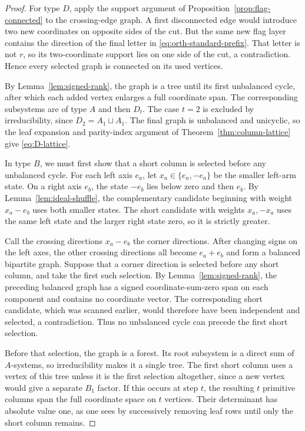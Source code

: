 \documentclass[11pt]{amsart}
\numberwithin{equation}{section}
\theoremstyle{definition}
\begin{document}
\begin{proof}
For type $D$, apply the support argument of Proposition~\ref{prop:flag-connected} to the crossing-edge graph. A first disconnected edge would introduce two new coordinates on opposite sides of the cut. But the same new flag layer contains the direction of the final letter in \eqref{eq:orth-standard-prefix}. That letter is not $r$, so its two-coordinate support lies on one side of the cut, a contradiction. Hence every selected graph is connected on its used vertices.

By Lemma~\ref{lem:signed-rank}, the graph is a tree until its first unbalanced cycle, after which each added vertex enlarges a full coordinate span. The corresponding subsystems are of type $A$ and then $D_t$. The case $t=2$ is excluded by irreducibility, since $D_2=A_1\sqcup A_1$. The final graph is unbalanced and unicyclic, so the leaf expansion and parity-index argument of Theorem~\ref{thm:column-lattice} give \eqref{eq:D-lattice}.

In type $B$, we must first show that a short column is selected before any unbalanced cycle. For each left axis $e_a$, let $x_a\in\{e_a,-e_a\}$ be the smaller left-arm state. On a right axis $e_b$, the state $-e_b$ lies below zero and then $e_b$. By Lemma~\ref{lem:ideal-shuffle}, the complementary candidate beginning with weight $x_a-e_b$ uses both smaller states. The short candidate with weights $x_a,-x_a$ uses the same left state and the larger right state zero, so it is strictly greater.

Call the crossing directions $x_a-e_b$ the corner directions. After changing signs on the left axes, the other crossing directions all become $e_a+e_b$ and form a balanced bipartite graph. Suppose that a corner direction is selected before any short column, and take the first such selection. By Lemma~\ref{lem:signed-rank}, the preceding balanced graph has a signed coordinate-sum-zero span on each component and contains no coordinate vector. The corresponding short candidate, which was scanned earlier, would therefore have been independent and selected, a contradiction. Thus no unbalanced cycle can precede the first short selection.

Before that selection, the graph is a forest. Its root subsystem is a direct sum of $A$-systems, so irreducibility makes it a single tree. The first short column uses a vertex of this tree unless it is the first selection altogether, since a new vertex would give a separate $B_1$ factor. If this occurs at step $t$, the resulting $t$ primitive columns span the full coordinate space on $t$ vertices. Their determinant has absolute value one, as one sees by successively removing leaf rows until only the short column remains.


\end{proof}
\end{document}
